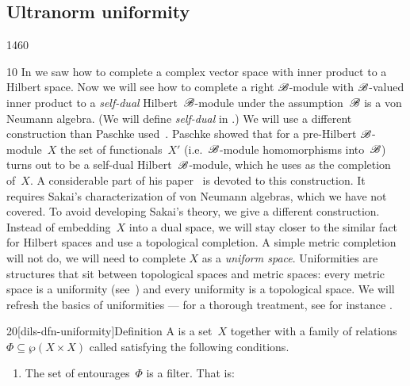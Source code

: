\subsection{Ultranorm uniformity}
\begin{parsec}{1460}%
\begin{point}{10}%
In 
    we saw how to complete a complex vector space with inner product
    to a Hilbert space.
Now we will see how to complete a right $\mathscr{B}$-module
    with $\mathscr{B}$-valued inner product
    to a \emph{self-dual} Hilbert~$\mathscr{B}$-module
    under the assumption~$\mathscr{B}$ is a von Neumann algebra.
    (We will define \emph{self-dual} in .)
    We will use a different construction than Paschke used~\cite{paschke}.
Paschke showed that for a pre-Hilbert $\mathscr{B}$-module~$X$
    the set of functionals~$X'$
        (i.e.~$\mathscr{B}$-module homomorphisms into~$\mathscr{B}$)
    turns out to  be a self-dual Hilbert~$\mathscr{B}$-module,
    which he uses as the completion of~$X$.
A considerable part of his paper~\cite{paschke}
    is devoted to this construction.
It requires Sakai's characterization of von Neumann algebras,
    which we have not covered.
To avoid developing Sakai's theory,
    we give a different construction.
Instead of embedding~$X$ into a dual space,
    we will stay closer to the similar fact for Hilbert spaces
    and use a topological completion.
A simple metric completion will not do,
    we will need to complete $X$ as a \emph{uniform space}.
Uniformities are structures that sit between topological spaces
    and metric spaces: every metric space is a uniformity
        (see~)
        and every uniformity is a topological space.
We will refresh the basics of uniformities ---
for a thorough treatment, see for instance \cite[Ch.~9]{willard}.
\end{point}
\begin{point}{20}[dils-dfn-uniformity]{Definition}%
    A  is a set~$X$
    together with a family of relations
    $\Phi \subseteq \wp (X\times X)$ called 
        satisfying the following conditions.
    \begin{enumerate}
    \item
        The set of entourages~$\Phi$ is a filter.
        That is:
\end{enumerate}
\end{point}
\end{parsec}

